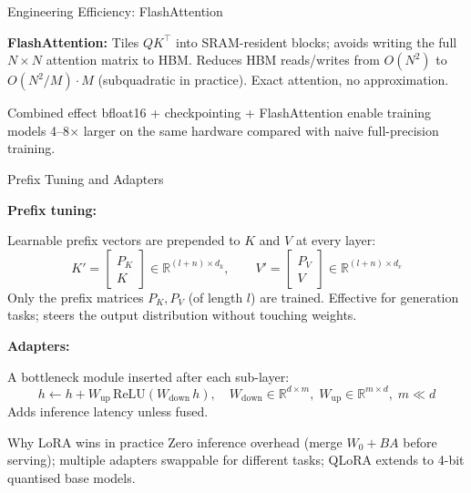\documentclass[9pt,t]{beamer}
\begin{document}
\begin{frame}[noframenumbering]{Engineering Efficiency: FlashAttention}

\textbf{FlashAttention:}
Tiles $QK^\top$ into SRAM-resident blocks; avoids writing the full $N\times N$
attention matrix to HBM.  Reduces HBM reads/writes from $O(N^2)$ to
$O(N^2 / M) \cdot M$ (subquadratic in practice).
Exact attention, no approximation.

\medskip
\begin{block}{Combined effect}
  bfloat16 + checkpointing + FlashAttention enable training models 4--8$\times$
  larger on the same hardware compared with naive full-precision training.
\end{block}
\end{frame}

\begin{frame}[noframenumbering]{Prefix Tuning and Adapters}

\textbf{Prefix tuning:}

Learnable prefix vectors are prepended to $K$ and $V$ at every layer:
\[
  K' = \begin{bmatrix} P_K \\ K \end{bmatrix} \in \mathbb{R}^{(l+n)\times d_k},
  \qquad
  V' = \begin{bmatrix} P_V \\ V \end{bmatrix} \in \mathbb{R}^{(l+n)\times d_v}
\]
Only the prefix matrices $P_K, P_V$ (of length $l$) are trained.
Effective for generation tasks; steers the output distribution without touching weights.

\medskip
\textbf{Adapters:}

A bottleneck module inserted after each sub-layer:
\[
  h \leftarrow h + W_{\text{up}}\,\text{ReLU}(W_{\text{down}}\,h),
  \quad W_{\text{down}} \in \mathbb{R}^{d\times m},\; W_{\text{up}} \in \mathbb{R}^{m\times d},\; m \ll d
\]
Adds inference latency unless fused.

\medskip
\begin{block}{Why LoRA wins in practice}
  Zero inference overhead (merge $W_0 + BA$ before serving);
  multiple adapters swappable for different tasks;
  QLoRA extends to 4-bit quantised base models.
\end{block}
\end{frame}
\end{document}
